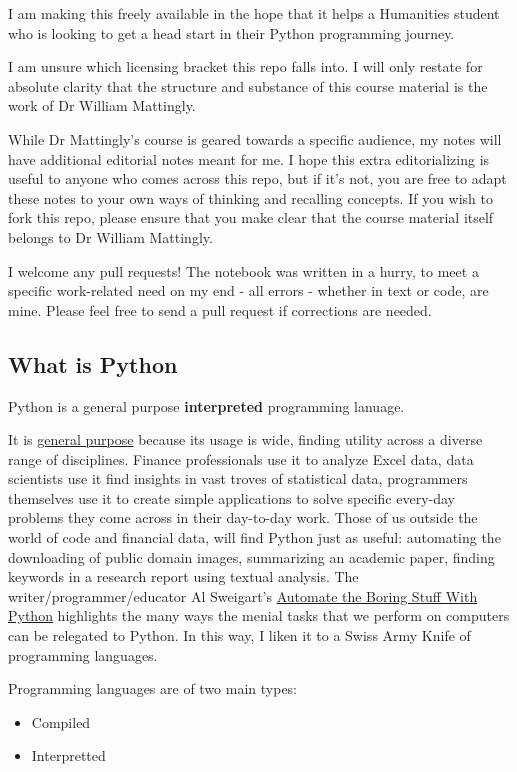 \documentclass[11pt]{article}
\begin{document}
I am making this freely available in the hope that it helps a Humanities student who is looking to get a head start in their Python programming journey.

I am unsure which licensing bracket this repo falls into. I will only restate for absolute clarity that the structure and substance of this course material is the work of Dr William Mattingly.

While Dr Mattingly's course is geared towards a specific audience, my notes will have additional editorial notes meant for me. I hope this extra editorializing is useful to anyone who comes across this repo, but if it's not, you are free to adapt these notes to your own ways of thinking and recalling concepts. If you wish to fork this repo, please ensure that you make clear that the course material itself belongs to Dr William Mattingly.

I welcome any pull requests! The notebook was written in a hurry, to meet a specific work-related need on my end - all errors - whether in text or code, are mine. Please feel free to send a pull request if corrections are needed.


\subsection{What is Python}
\label{sec:org1084918}
Python is a general purpose \textbf{interpreted} programming lanuage.

It is \uline{general purpose} because its usage is wide, finding utility across a diverse range of disciplines. Finance professionals use it to analyze Excel data, data scientists use it find insights in vast troves of statistical data, programmers themselves use it to create simple applications to solve specific every-day problems they come across in their day-to-day work. Those of us outside the world of code and financial data, will find Python just as useful: automating the downloading of public domain images, summarizing an academic paper, finding keywords in a research report using textual analysis. The writer/programmer/educator Al Sweigart's \href{https://automatetheboringstuff.com/}{Automate the Boring Stuff With Python} highlights the many ways the menial tasks that we perform on computers can be relegated to Python. In this way, I liken it to a Swiss Army Knife of programming languages.

Programming languages are of two main types:
\begin{itemize}
\item Compiled
\item Interpretted
\end{itemize}
\end{document}

